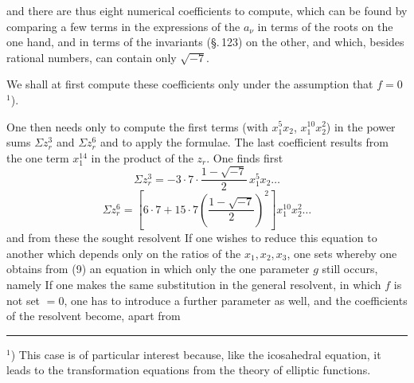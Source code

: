 
and there are thus eight numerical coefficients to compute, which
can be found by comparing a few terms in the expressions of the
$a_\nu$ in terms of the roots on the one hand, and in terms of the invariants (\S.\,123)
on the other, and which, besides rational numbers, can contain only
$\sqrt{-7}$.

We shall at first compute these coefficients only under the
assumption that $f=0$ ${}^1$).

One then needs only to compute the first terms (with $x_1^5x_2$, $x_1^{10}x_2^2$)
in the power sums $\Sigma z_r^3$ and $\Sigma z_r^6$ and to apply the
 formulae. The last coefficient results
from the one term $x_1^{14}$ in the product of the $z_r$. One
finds first
\[
\Sigma z_r^3 = -3\cdot7\cdot\frac{1-\sqrt{-7}}{2}\,x_1^5x_2\dots
\]
\[
\Sigma z_r^6 = \left[6\cdot7 + 15\cdot7\left(\frac{1-\sqrt{-7}}{2}\right)^2\right]x_1^{10}x_2^2\dots
\]
and from these the sought resolvent
If one wishes to reduce this equation to another which
depends only on the ratios of the $x_1, x_2, x_3$, one sets
whereby one obtains from (9) an equation in which only the
one parameter $g$ still occurs, namely
If one makes the same substitution in the general resolvent,
in which $f$ is not set $=0$, one has to introduce a
further parameter
as well, and the coefficients of the resolvent become, apart from

\par\noindent\rule{0.3\linewidth}{0.4pt}\par
${}^1$) This case is of particular interest because, like
the icosahedral equation, it leads to the transformation equations from the
theory of elliptic functions.
